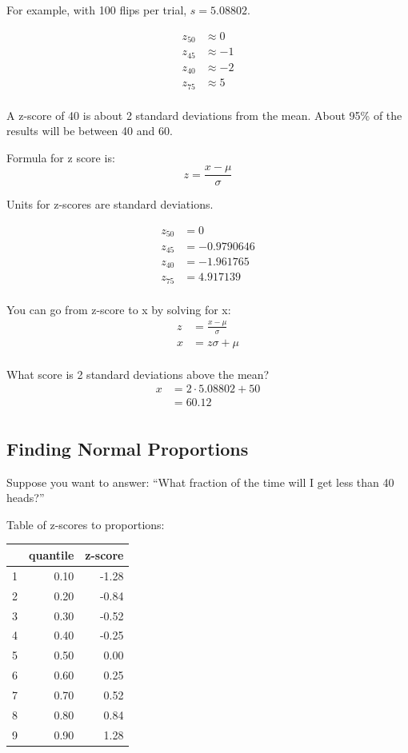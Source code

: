 \documentclass{exam}
\begin{document}
  For example, with 100 flips per trial, $s = 5.08802$.

  \begin{align*}
    z_{50} & \approx 0 \\
    z_{45} & \approx -1 \\
    z_{40} & \approx -2 \\
    z_{75} & \approx 5 \\
  \end{align*}

  A z-score of 40 is about 2 standard deviations from the mean.  About 95\% of the
  results will be between 40 and 60.

  Formula for z score is:
  \[
    z = \frac{x - \mu}{\sigma}
  \]

  Units for z-scores are standard deviations.

  \begin{align*}
    z_{50} &= 0 \\
    z_{45} &= -0.9790646 \\
    z_{40} &= -1.961765 \\
    z_{75} &= 4.917139 \\
  \end{align*}

  You can go from z-score to x by solving for x:
  \begin{align*}
    z &= \frac{x - \mu}{\sigma} \\
    x &= z \sigma + \mu \\
  \end{align*}

  What score is 2 standard deviations above the mean?
  \begin{align*}
    x & = 2 \cdot 5.08802 + 50 \\
      & = 60.12 \\
  \end{align*}

  \subsection{Finding Normal Proportions}
  Suppose you want to answer: ``What fraction of the time will I get less than 40
  heads?''

  Table of z-scores to proportions:
  \begin{table}[H]
    \centering
    \begin{tabular}{rrr}
      \toprule
        & quantile & z-score \\
      \midrule
      1 & 0.10     & -1.28 \\
      2 & 0.20     & -0.84 \\
      3 & 0.30     & -0.52 \\
      4 & 0.40     & -0.25 \\
      5 & 0.50     & 0.00 \\
      6 & 0.60     & 0.25 \\
      7 & 0.70     & 0.52 \\
      8 & 0.80     & 0.84 \\
      9 & 0.90     & 1.28 \\
      \bottomrule
    \end{tabular}
  \end{table}
\end{document}
